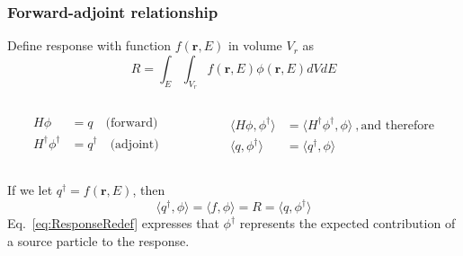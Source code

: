 \documentclass[xcolor=x11names,compress, handout]{beamer}
\renewcommand{\(}{\begin{columns}}
\renewcommand{\)}{\end{columns}}
\newcommand{\<}[1]{\begin{column}{#1}}
\renewcommand{\>}{\end{column}}
\newcommand{\ve}[1]{\ensuremath{\mathbf{#1}}}
\begin{document}
\begin{frame}[fragile]
  \frametitle{Forward-adjoint relationship}
Define response with function $f(\ve{r}, E)$ in volume $V_r$ as
%
\begin{equation}
 R = \int_E \int_{V_r} f(\ve{r}, E) \phi(\ve{r}, E) dV dE 
 \label{eq:Response}
\end{equation}\pause
%
\begin{columns}
  \begin{column}{0.5\textwidth}
	\begin{align}
  	H\phi &= q \quad \text{(forward)}\nonumber \\
  	H^{\dagger} \phi^{\dagger} &= q^{\dagger} \quad 
  	\text{(adjoint)}\nonumber
  	\end{align}
  \end{column}
  \begin{column}{0.5\textwidth}
  	\begin{align}
  	\langle H\phi, \phi^{\dagger} \rangle &= \langle H^{\dagger} \phi^{\dagger}, \phi \rangle \:, \text{and therefore} \nonumber \\
  	\langle q, \phi^{\dagger} \rangle &= \langle q^{\dagger}, \phi \rangle \nonumber
  	\end{align}
  \end{column}
\end{columns}
\vspace*{1 em}
\pause
If we let $q^{\dagger} = f(\ve{r}, E)$, then
%
\begin{equation}
 \langle q^{\dagger}, \phi \rangle = \langle f, \phi \rangle = R = \langle q, \phi^{\dagger} \rangle
 \label{eq:ResponseRedef}
\end{equation}
%
Eq.\ \eqref{eq:ResponseRedef} expresses that $\phi^{\dagger}$ represents the expected contribution of a source particle to the response.

\end{frame}
\end{document}
